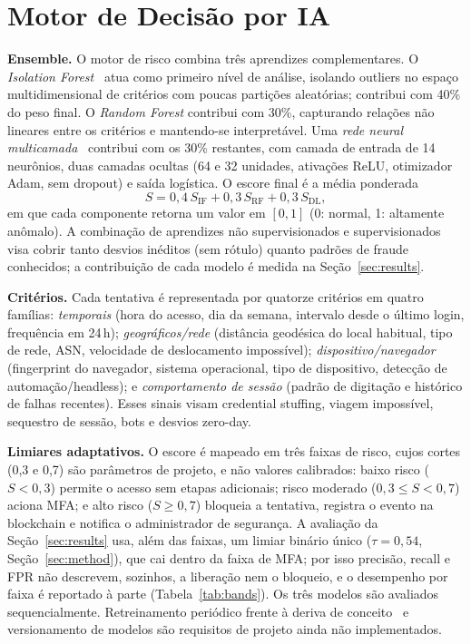 \documentclass[conference]{IEEEtran}
\begin{document}
\section{Motor de Decisão por IA}
\label{sec:ai}
\textbf{Ensemble.} O motor de risco combina três aprendizes
complementares. O \emph{Isolation Forest}~\cite{liu2008} atua como
primeiro nível de análise, isolando outliers no espaço multidimensional
de critérios com poucas partições aleatórias; contribui com 40\% do peso
final. O \emph{Random Forest} contribui com 30\%, capturando relações não
lineares entre os critérios e mantendo-se interpretável. Uma \emph{rede
neural multicamada}~\cite{goodfellow2016} contribui com os 30\%
restantes, com camada de entrada de 14 neurônios, duas camadas ocultas
(64 e 32 unidades, ativações ReLU, otimizador Adam, sem dropout) e saída
logística. O escore final é a média ponderada
\begin{equation}
S = 0{,}4\,S_{\mathrm{IF}} + 0{,}3\,S_{\mathrm{RF}} + 0{,}3\,S_{\mathrm{DL}},
\label{eq:ensemble}
\end{equation}
em que cada componente retorna um valor em $[0,1]$ (0: normal, 1:
altamente anômalo). A combinação de aprendizes não supervisionados e
supervisionados visa cobrir tanto desvios inéditos (sem rótulo) quanto
padrões de fraude conhecidos; a contribuição de cada modelo é medida na
Seção~\ref{sec:results}.

\textbf{Critérios.} Cada tentativa é representada por quatorze critérios
em quatro famílias: \emph{temporais} (hora do acesso,
dia da semana, intervalo desde o último login, frequência em 24\,h);
\emph{geográficos/rede} (distância geodésica do local habitual, tipo de
rede, ASN, velocidade de deslocamento impossível);
\emph{dispositivo/navegador} (fingerprint do navegador, sistema
operacional, tipo de dispositivo, detecção de automação/headless); e
\emph{comportamento de sessão} (padrão de digitação e histórico de falhas
recentes). Esses sinais visam credential stuffing, viagem impossível,
sequestro de sessão, bots e desvios zero-day.

\textbf{Limiares adaptativos.} O escore é mapeado em três faixas de
risco, cujos cortes (0,3 e 0,7) são parâmetros de projeto, e não valores
calibrados:
baixo risco ($S<0{,}3$) permite o acesso sem etapas adicionais; risco
moderado ($0{,}3\le S<0{,}7$) aciona MFA; e alto risco ($S\ge0{,}7$)
bloqueia a tentativa, registra o evento na blockchain e notifica o
administrador de segurança. A avaliação da
Seção~\ref{sec:results} usa, além das faixas, um limiar binário único
($\tau=0{,}54$, Seção~\ref{sec:method}), que cai dentro da faixa de MFA;
por isso precisão, recall e FPR não descrevem, sozinhos, a liberação nem
o bloqueio, e o desempenho por faixa é reportado à parte
(Tabela~\ref{tab:bands}).
Os três modelos são avaliados sequencialmente. Retreinamento periódico
frente à deriva de conceito~\cite{gama2014} e versionamento de modelos
são requisitos de projeto ainda não implementados.
\end{document}
